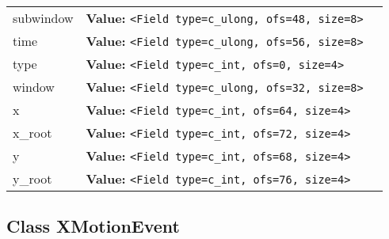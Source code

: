 \begin{longtable}{|p{\varnamewidth}|p{\vardescrwidth}|l}
\cline{1-2}
\raggedright s\-u\-b\-w\-i\-n\-d\-o\-w\- & \raggedright \textbf{Value:} 
{\tt {\textless}Field type=c\_ulong, ofs=48, size=8{\textgreater}}&\\
\cline{1-2}
\raggedright t\-i\-m\-e\- & \raggedright \textbf{Value:} 
{\tt {\textless}Field type=c\_ulong, ofs=56, size=8{\textgreater}}&\\
\cline{1-2}
\raggedright t\-y\-p\-e\- & \raggedright \textbf{Value:} 
{\tt {\textless}Field type=c\_int, ofs=0, size=4{\textgreater}}&\\
\cline{1-2}
\raggedright w\-i\-n\-d\-o\-w\- & \raggedright \textbf{Value:} 
{\tt {\textless}Field type=c\_ulong, ofs=32, size=8{\textgreater}}&\\
\cline{1-2}
\raggedright x\- & \raggedright \textbf{Value:} 
{\tt {\textless}Field type=c\_int, ofs=64, size=4{\textgreater}}&\\
\cline{1-2}
\raggedright x\-\_\-r\-o\-o\-t\- & \raggedright \textbf{Value:} 
{\tt {\textless}Field type=c\_int, ofs=72, size=4{\textgreater}}&\\
\cline{1-2}
\raggedright y\- & \raggedright \textbf{Value:} 
{\tt {\textless}Field type=c\_int, ofs=68, size=4{\textgreater}}&\\
\cline{1-2}
\raggedright y\-\_\-r\-o\-o\-t\- & \raggedright \textbf{Value:} 
{\tt {\textless}Field type=c\_int, ofs=76, size=4{\textgreater}}&\\
\cline{1-2}
\end{longtable}



\subsection{Class XMotionEvent}

